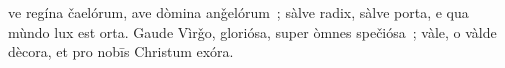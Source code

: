 ve regína čaelórum, ave dòmina anǧelórum~; sàlve radix, sàlve porta, e qua mùndo lux est orta. Gaude Vìrǧo, gloriósa, super òmnes spečiósa~; vàle, o vàlde dècora, et pro nobīs Christum exóra.
